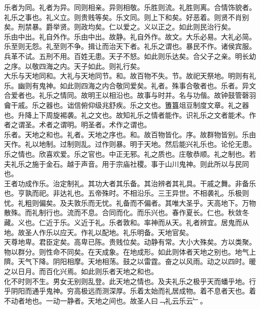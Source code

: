 \documentclass{zhvt-classic}
\begin{document}
\hspace*{2em}乐者为同。礼者为异。同则相亲。异则相敬。乐胜则流。礼胜则离。合情饰貌者。礼乐之事也。礼义立。则贵贱等矣。乐文同。则上下和矣。好恶着。则贤不肖别矣。刑禁暴。爵举贤。则政均矣。仁以爱之。义以正之。如此则民治行矣。\\
\hspace*{2em}乐由中出。礼自外作。乐由中出。故静。礼自外作。故文。大乐必易。大礼必简。乐至则无怨。礼至则不争。揖让而治天下者。礼乐之谓也。暴民不作。诸侯宾服。兵革不试。五刑不用。百姓无患。天子不怒。如此则乐达矣。合父子之亲。明长幼之序。以敬四海之内。天子如此。则礼行矣。\\
\hspace*{2em}大乐与天地同和。大礼与天地同节。和。故百物不失。节。故祀天祭地。明则有礼乐。幽则有鬼神。如此则四海之内合敬同爱矣。礼者。殊事合敬者也。乐者。异文合爱者也。礼乐之情同。故明王以相沿也。故事与时并。名与功偕。故钟鼓管磬羽龠干戚。乐之器也。诎信俯仰级兆舒疾。乐之文也。簠簋俎豆制度文章。礼之器也。升降上下周旋裼袭。礼之文也。故知礼乐之情者能作。识礼乐之文者能术。作者之谓圣。术者之谓明。明圣者。术作之谓也。\\
\hspace*{2em}乐者。天地之和也。礼者。天地之序也。和。故百物皆化。序。故群物皆别。乐由天作。礼以地制。过制则乱。过作则暴。明于天地。然后能兴礼乐也。论伦无患。乐之情也。欣喜欢爱。乐之官也。中正无邪。礼之质也。庄敬恭顺。礼之制也。若夫礼乐之施于金石。越于声音。用于宗庙社稷。事于山川鬼神。则此所以与民同也。\\
\hspace*{2em}王者功成作乐。治定制礼。其功大者其乐备。其治辨者其礼具。干戚之舞。非备乐也。亨孰而祀。非达礼也。五帝殊时。不相沿乐。三王异世。不相袭礼。乐极则忧。礼粗则偏矣。及夫敦乐而无忧。礼备而不偏者。其唯大圣乎。天高地下。万物散殊。而礼制行也。流而不息。合同而化。而乐兴也。春作夏长。仁也。秋敛冬藏。义也。仁近于乐。义近于礼。乐者敦和。率神而从天。礼者辨宜。居鬼而从地。故圣人作乐以应天。作礼以配地。礼乐明备。天地官矣。\\
\hspace*{2em}天尊地卑。君臣定矣。高卑已陈。贵贱位矣。动静有常。大小大殊矣。方以类聚。物以群分。则性命不同矣。在天成象。在地成形。如此则体者天地之别也。地气上隮。天气下降。阴阳相摩。天地相荡。鼓之以雷霆。奋之以风雨。动之以四时。暖之以日月。而百化兴焉。如此则乐者天地之和也。\\
\hspace*{2em}化不时则不生。男女无别则乱登。此天地之情也。及夫礼乐之极乎天而蟠乎地。行乎阴阳而通乎鬼神。穷高极远而测深厚。乐着太始而礼居成物。着不息者天也。着不动者地也。一动一静者。天地之间也。故圣人曰﹁礼云乐云﹂。\\
\end{document}
